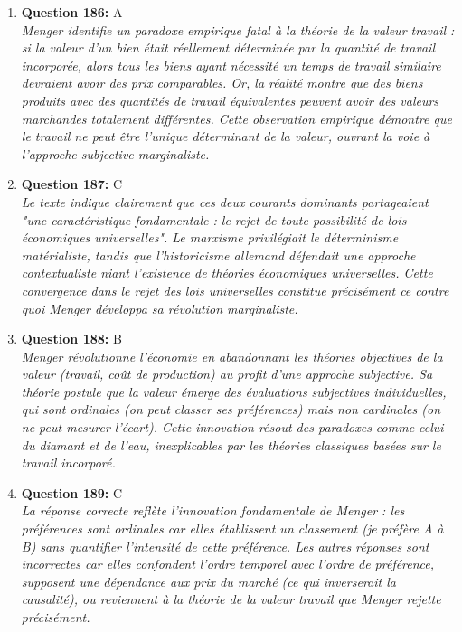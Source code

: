 \documentclass[12pt,a4paper]{article}
\begin{document}
\begin{enumerate}
\item \textbf{Question 186:} A
\\ \textit{Menger identifie un paradoxe empirique fatal à la théorie de la valeur travail : si la valeur d'un bien était réellement déterminée par la quantité de travail incorporée, alors tous les biens ayant nécessité un temps de travail similaire devraient avoir des prix comparables. Or, la réalité montre que des biens produits avec des quantités de travail équivalentes peuvent avoir des valeurs marchandes totalement différentes. Cette observation empirique démontre que le travail ne peut être l'unique déterminant de la valeur, ouvrant la voie à l'approche subjective marginaliste.}

\item \textbf{Question 187:} C
\\ \textit{Le texte indique clairement que ces deux courants dominants partageaient "une caractéristique fondamentale : le rejet de toute possibilité de lois économiques universelles". Le marxisme privilégiait le déterminisme matérialiste, tandis que l'historicisme allemand défendait une approche contextualiste niant l'existence de théories économiques universelles. Cette convergence dans le rejet des lois universelles constitue précisément ce contre quoi Menger développa sa révolution marginaliste.}

\item \textbf{Question 188:} B
\\ \textit{Menger révolutionne l'économie en abandonnant les théories objectives de la valeur (travail, coût de production) au profit d'une approche subjective. Sa théorie postule que la valeur émerge des évaluations subjectives individuelles, qui sont ordinales (on peut classer ses préférences) mais non cardinales (on ne peut mesurer l'écart). Cette innovation résout des paradoxes comme celui du diamant et de l'eau, inexplicables par les théories classiques basées sur le travail incorporé.}

\item \textbf{Question 189:} C
\\ \textit{La réponse correcte reflète l'innovation fondamentale de Menger : les préférences sont ordinales car elles établissent un classement (je préfère A à B) sans quantifier l'intensité de cette préférence. Les autres réponses sont incorrectes car elles confondent l'ordre temporel avec l'ordre de préférence, supposent une dépendance aux prix du marché (ce qui inverserait la causalité), ou reviennent à la théorie de la valeur travail que Menger rejette précisément.}


\end{enumerate}
\end{document}
